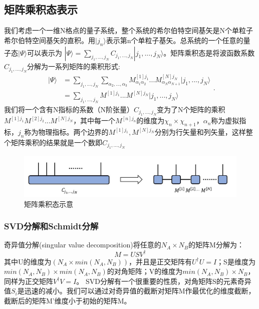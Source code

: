 \documentclass[12pt]{article}
\begin{document}
	   \subsection{矩阵乘积态表示}
	   我们考虑一个一维N格点的量子系统，整个系统的希尔伯特空间基矢是N个单粒子希尔伯特空间基矢的直积。用$|j_n\rangle$表示第n个单粒子基矢。总系统的一个任意的量子态$|\Psi\rangle$可以表示为\cite{schollwock2011density} $|\Psi\rangle=\sum_{j_1,...,j_N}C_{j_1,...,j_N}|j_1,...,j_N\rangle$。矩阵乘积态是将波函数系数$C_{j_1,...,j_N}$分解为一系列矩阵的乘积形式:
	   \begin{equation}\begin{split}
	   	|\Psi\rangle&=\sum_{j_1,...,j_N}\sum_{\alpha_2,...,\alpha_3}M_{\alpha_1\alpha_2}^{[1]j_1}...M_{\alpha_N\alpha_{N+1}}^{[N]j_N}|j_1,...,j_N\rangle\\ &=\sum_{j_1,...,j_N}M^{[1]j_1}...M^{[N]j_N}|j_1,...,j_N\rangle
	   \end{split}.\end{equation}
       我们将一个含有N指标的系数（N阶张量）$ C_{j_1,...,j_N} $变为了N个矩阵的乘积$ M^{[1]j_1}M^{[2]j_2}...M^{[N]j_N} $，其中每一个$M^{[n]j_n}$的维度为$ \chi_n\times\chi_{n+1} $，$\alpha_n$称为虚拟指标，$j_n$称为物理指标。两个边界的$M^{[1]j_1},M^{[N]j_N}$分别为行矢量和列矢量，这样整个矩阵乘积的结果就是一个数即$C_{j_1,...,j_N}$
       \begin{figure}[H]
       	\centering
       	\includegraphics[scale=0.7]{3.矩阵乘积态示意}
       	\caption[9pt]{ 矩阵乘积态示意}
       	\label{fig:3}
       \end{figure}
       
       \subsubsection{SVD分解和Schmidt分解}
       奇异值分解(singular value decomposition)将任意的$N_A\times N_B$的矩阵M分解为：$$M=USV^{\dagger}$$其中U的维度为$(N_A\times min(N_A,N_B))$，并且是正交矩阵有$U^{\dagger}U=I$；S是维度为$min(N_A,N_B)\times min(N_A,N_B)$的对角矩阵；V的维度为$min(N_A,N_B)\times N_B$，同样为正交矩阵$V^{\dagger}V=I$。
       SVD分解有一个很重要的性质，对角矩阵S的元素奇异值$S_i$是迅速的减小。我们可以通过对奇异值的截断对矩阵M作最优化的维度截断，截断后的矩阵M'维度小于初始的矩阵M。
       
\end{document}
